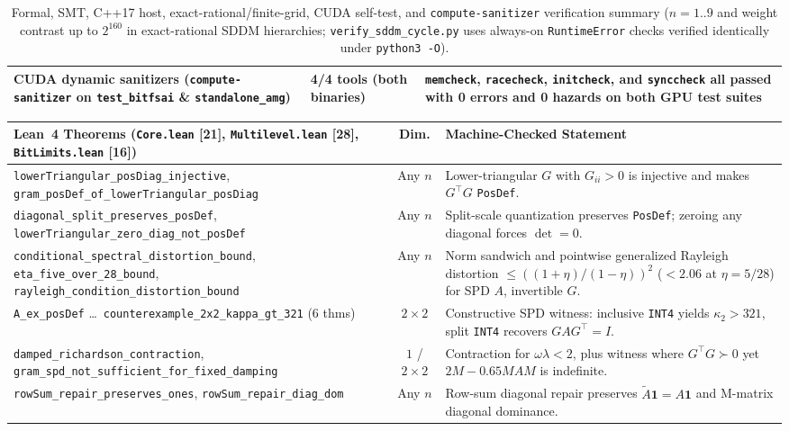 \documentclass[10pt]{article}
\begin{document}
\begin{table}[t]
\begin{tabular}{@{}p{}p{}p{}@{}}
CUDA dynamic sanitizers (\texttt{compute-sanitizer} on \texttt{test\_bitfsai} \& \texttt{standalone\_amg}) & 4/4 tools (both binaries) & \texttt{memcheck}, \texttt{racecheck}, \texttt{initcheck}, and \texttt{synccheck} all passed with 0 errors and 0 hazards on both GPU test suites \\
\bottomrule
\end{tabular}
\caption{Formal, SMT, C++17 host, exact-rational/finite-grid, CUDA self-test, and \texttt{compute-sanitizer} verification summary ($n = 1..9$ and weight contrast up to $2^{160}$ in exact-rational SDDM hierarchies; \texttt{verify\_sddm\_cycle.py} uses always-on \texttt{RuntimeError} checks verified identically under \texttt{python3 -O}).}
\label{tab:verify_summary}
\end{table}

\begin{table}[t]
\centering\scriptsize
\begin{tabular}{@{}p{}cp{}@{}}
\toprule
Lean~4 Theorems (\texttt{Core.lean} [21], \texttt{Multilevel.lean} [28], \texttt{BitLimits.lean} [16]) & Dim. & Machine-Checked Statement \\
\midrule
\texttt{lowerTriangular\_posDiag\_injective}, \texttt{gram\_posDef\_of\_lowerTriangular\_posDiag} & Any $n$ & Lower-triangular $G$ with $G_{ii} > 0$ is injective and makes $G^\top G$ \texttt{PosDef}. \\
\texttt{diagonal\_split\_preserves\_posDef}, \texttt{lowerTriangular\_zero\_diag\_not\_posDef} & Any $n$ & Split-scale quantization preserves \texttt{PosDef}; zeroing any diagonal forces $\det = 0$. \\
\texttt{conditional\_spectral\_distortion\_bound}, \texttt{eta\_five\_over\_28\_bound}, \texttt{rayleigh\_condition\_distortion\_bound} & Any $n$ & Norm sandwich and pointwise generalized Rayleigh distortion $\le ((1+\eta)/(1-\eta))^2$ ($< 2.06$ at $\eta = 5/28$) for SPD $A$, invertible $G$. \\
\texttt{A\_ex\_posDef} \dots\ \texttt{counterexample\_2x2\_kappa\_gt\_321} (6 thms) & $2\times 2$ & Constructive SPD witness: inclusive \texttt{INT4} yields $\kappa_2 > 321$, split \texttt{INT4} recovers $G A G^\top = I$. \\
\texttt{damped\_richardson\_contraction}, \texttt{gram\_spd\_not\_sufficient\_for\_fixed\_damping} & $1$ / $2\times 2$ & Contraction for $\omega\lambda < 2$, plus witness where $G^\top G \succ 0$ yet $2M - 0.65 M A M$ is indefinite. \\
\texttt{rowSum\_repair\_preserves\_ones}, \texttt{rowSum\_repair\_diag\_dom} & Any $n$ & Row-sum diagonal repair preserves $\tilde{A}\mathbf{1} = A\mathbf{1}$ and M-matrix diagonal dominance. \\

\end{tabular}
\end{table}
\end{document}
